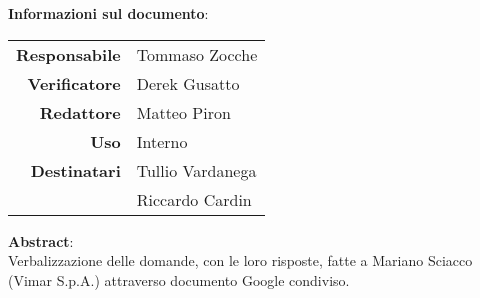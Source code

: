 \begin{center}
\textbf{Informazioni sul documento}: \\
\vspace{0.5cm}

\begin{tabular}{r|l}
    \textbf{Responsabile} & Tommaso Zocche \\ 
    \textbf{Verificatore} &  Derek Gusatto\\ 
    \textbf{Redattore} & Matteo Piron \\ 
    \textbf{Uso} & Interno \\ 
    \textbf{Destinatari} & Tullio Vardanega \\ & Riccardo Cardin \\ 
\end{tabular}

\vfill

\textbf{Abstract}: \\
\vspace{0.5cm}
Verbalizzazione delle domande, con le loro risposte, fatte a Mariano Sciacco (Vimar S.p.A.) attraverso documento Google condiviso.
\end{center}


\bigskip